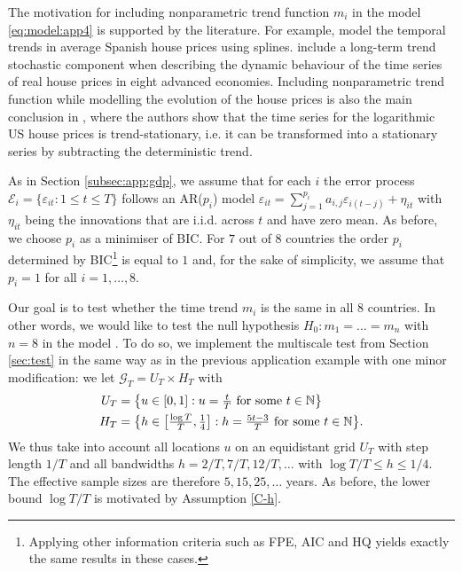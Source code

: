 \documentclass[a4paper,12pt]{article}
\makeatletter
\renewcommand{\eqref}[1]{\tagform@{\ref{#1}}}
\makeatother
\begin{document}
The motivation for including nonparametric trend function $m_i$ in the model \ref{eq:model:app4} is supported by the literature. For example, \cite{Ugarte2009} model the temporal trends in average Spanish house prices using splines. \cite{Winter2022} include a long-term trend stochastic component when describing the dynamic behaviour of the time series of real house prices in eight advanced economies. Including nonparametric trend function while modelling the evolution of the house prices is also the main conclusion in \cite{Zhang2016}, where the authors show that the time series for the logarithmic US house prices is trend-stationary, i.e. it can be transformed into a stationary series by subtracting the deterministic trend.

As in Section \ref{subsec:app:gdp}, we assume that for each $i$ the error process $\mathcal{E}_i = \{\varepsilon_{it}: 1 \leq t \leq T\}$ follows an AR($p_i$) model $\varepsilon_{it} = \sum_{j=1}^{p_i} a_{i, j} \varepsilon_{i(t-j)} + \eta_{it}$ with $\eta_{it}$ being the innovations that are i.i.d. across $t$ and have zero mean. As before, we choose $p_i$ as a minimiser of BIC. For $7$ out of $8$ countries the order $p_i$ determined by BIC\footnote{Applying other information criteria such as FPE, AIC and HQ yields exactly the same results in these cases.} is equal to $1$ and, for the sake of simplicity, we assume that $p_i = 1$ for all $i =1, \ldots, 8$.

Our goal is to test whether the time trend $m_i$ is the same in all $8$ countries. In other words, we would like to test the null hypothesis $H_0: m_1 = \ldots = m_n$ with $n = 8$ in the model \eqref{eq:model:app4}. To do so, we implement the multiscale test from Section \ref{sec:test} in the same way as in the previous application example with one minor modification: we let $\mathcal{G}_T = U_T \times H_T$ with 
\begin{align*}
U_T & = \big\{ u \in [0,1]: u = \textstyle{\frac{t}{T}} \text{ for some } t \in \mathbb{N} \big\} \\
H_T & = \big\{ h \in \big[ \textstyle{\frac{\log T}{T}}, \textstyle{\frac{1}{4}} \big]:  h = \textstyle{\frac{5t - 3}{T}} \text{ for some } t \in \mathbb{N} \big\}. 
\end{align*}
We thus take into account all locations $u$ on an equidistant grid $U_T$ with step length $1/T$ and all bandwidths $h=2/T, 7/T, 12/T,\ldots$ with $\log T /T \le h \le 1/4$. The effective sample sizes are therefore $5, 15, 25, \ldots$ years. As before, the lower bound $\log T / T$ is motivated by Assumption \ref{C-h}.
\end{document}
